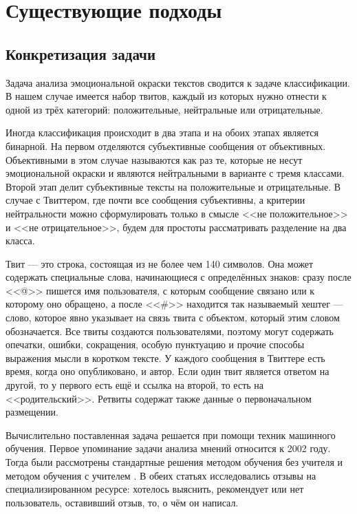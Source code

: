 
\section{Существующие подходы}

\subsection{Конкретизация задачи}
Задача анализа эмоциональной окраски текстов сводится к задаче классификации. В
нашем случае имеется набор твитов, каждый из которых нужно отнести к одной из
трёх категорий: положительные, нейтральные или отрицательные.

Иногда классификация происходит в два этапа и на обоих этапах является бинарной.
На первом отделяются субъективные сообщения от объективных. Объективными в этом
случае называются как раз те, которые не несут эмоциональной окраски и
являются нейтральными в варианте с тремя классами. Второй этап делит субъективные
тексты на положительные и отрицательные. В случае с Твиттером, где почти все
сообщения субъективны, а критерии нейтральности можно сформулировать только в
смысле <<не положительное>> и <<не отрицательное>>, будем для простоты рассматривать разделение
на два класса.

Твит --- это строка, состоящая из не более чем 140 символов. Она может содержать
специальные слова, начинающиеся с определённых знаков: сразу после <<@>> пишется
имя пользователя, с которым сообщение связано или к которому оно обращено,
а после <<\#>> находится так называемый хештег --- слово, которое явно указывает
на связь твита с объектом, который этим словом обозначается. Все твиты создаются
пользователями, поэтому могут содержать опечатки, ошибки, сокращения,
особую пунктуацию и прочие способы выражения мысли в коротком тексте.
У каждого сообщения в Твиттере есть время, когда оно опубликовано, и автор.
Если один твит является ответом на другой, то у первого есть ещё и ссылка на второй,
то есть на <<родительский>>. Ретвиты содержат также данные о первоначальном
размещении.

Вычислительно поставленная задача решается при помощи техник машинного обучения. Первое
упоминание задачи анализа мнений относится к 2002 году. Тогда были рассмотрены
стандартные решения методом обучения без учителя \cite{turney2002thumbs} и методом обучения с
учителем \cite{pang2002thumbs}. В обеих статьях исследовались отзывы на
специализированном ресурсе: хотелось выяснить, рекомендует или нет пользователь, оставивший отзыв,
то, о чём он написал.

